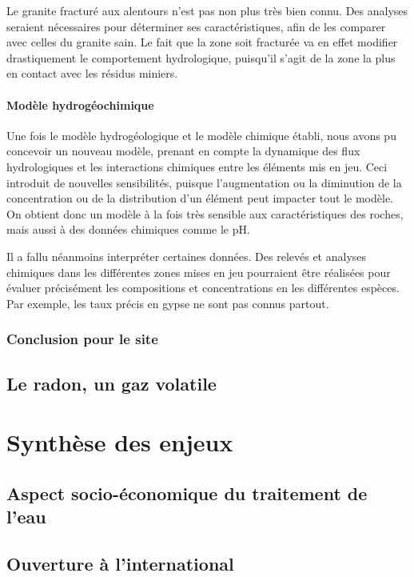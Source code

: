 \documentclass{article}
\begin{document}
Le granite fracturé aux alentours n’est pas non plus très bien connu. Des analyses seraient nécessaires pour déterminer ses caractéristiques, afin de les comparer avec celles du granite sain. Le fait que la zone soit fracturée va en effet modifier drastiquement le comportement hydrologique, puisqu’il s’agit de la zone la plus en contact avec les résidus miniers.

\paragraph{Modèle hydrogéochimique}

Une fois le modèle hydrogéologique et le modèle chimique établi, nous avons pu concevoir un nouveau modèle, prenant en compte la dynamique des flux hydrologiques et les interactions chimiques entre les éléments mis en jeu. Ceci introduit de nouvelles sensibilités, puisque l’augmentation ou la diminution de la concentration ou de la distribution d’un élément peut impacter tout le modèle. On obtient donc un modèle à la fois très sensible aux caractéristiques des roches, mais aussi à des données chimiques comme le pH.

Il a fallu néanmoins interpréter certaines données. Des relevés et analyses chimiques dans les différentes zones mises en jeu pourraient être réalisées pour évaluer précisément les compositions et concentrations en les différentes espèces. Par exemple, les taux précis en gypse ne sont pas connus partout.


\subsubsection{Conclusion pour le site}

\subsection{Le radon, un gaz volatile}

\newpage
\section{Synthèse des enjeux}
\subsection{Aspect socio-économique du traitement de l’eau}
\subsection{Ouverture à l’international}
\end{document}
